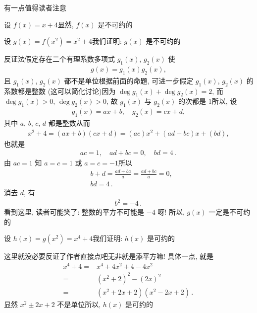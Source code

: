 \begin{remark}
    有一点值得读者注意\period

    设 $f(x) = x + 4$\period 显然, $f(x)$ 是不可约的\period

    设 $g(x) = f(x^2) = x^2 + 4$\period 我们证明: $g(x)$ 是不可约的\period

    反证法\period 假定存在二个有理系数多项式 $g_1 (x)$, $g_2 (x)$ 使
    \begin{align*}
        g(x) = g_1 (x) g_2 (x),
    \end{align*}
    且 $g_1 (x)$, $g_2 (x)$ 都不是单位\period 根据前面的命题, 可进一步假定 $g_1 (x)$, $g_2 (x)$ 的系数都是整数 (这可以简化讨论)\period 因为 $\deg g_1 (x) + \deg g_2 (x) = 2$, 而 $\deg g_1 (x) > 0$, $\deg g_2 (x) > 0$, 故 $g_1 (x)$ 与 $g_2 (x)$ 的次都是 $1$\period 所以, 设
    \begin{align*}
        g_1 (x) = ax + b, \quad g_2 (x) = cx + d,
    \end{align*}
    其中 $a$, $b$, $c$, $d$ 都是整数\period 从而
    \begin{align*}
        x^2 + 4 = (ax + b)(cx + d) = (ac) x^2 + (ad + bc) x + (bd),
    \end{align*}
    也就是
    \begin{align*}
        ac = 1, \quad ad + bc = 0, \quad bd = 4 \period
    \end{align*}
    由 $ac = 1$ 知 $a = c = 1$ 或 $a = c = -1$\period 所以
    \begin{align*}
         & b + d = \frac{ad + ba}{a} = \frac{ad + bc}{a} = 0, \\
         & bd = 4 \period
    \end{align*}
    消去 $d$, 有
    \begin{align*}
        b^2 = -4 \period
    \end{align*}
    看到这里, 读者可能笑了: 整数的平方不可能是 $-4$ 呀! 所以, $g(x)$ 一定是不可约的\period

    设 $h(x) = g(x^2) = x^4 + 4$\period 我们证明: $h(x)$ 是可约的\period

    这里就没必要反证了\period 作者直接点吧\period 无非就是添平方嘛! 具体一点, 就是
    \begin{align*}
        x^4 + 4
        = {} & x^4 + 4x^2 + 4 - 4x^2                 \\
        = {} & (x^2 + 2)^2 - (2x)^2                  \\
        = {} & (x^2 + 2x + 2) (x^2 - 2x + 2) \period
    \end{align*}
    显然 $x^2 \pm 2x + 2$ 不是单位\period 所以, $h(x)$ 是可约的\period


\end{remark}
